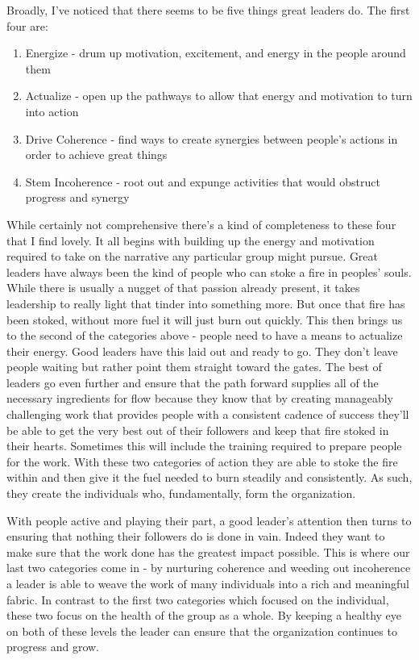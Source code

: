 \documentclass[10pt,a5paper]{book}
\begin{document}
Broadly, I've noticed that there seems to be five things great leaders do. The first four are:
\begin{enumerate}
\item Energize - drum up motivation, excitement, and energy in the people around them
\item Actualize - open up the pathways to allow that energy and motivation to turn into action
\item Drive Coherence - find ways to create synergies between people's actions in order to achieve great things
\item Stem Incoherence - root out and expunge activities that would obstruct progress and synergy
\end{enumerate}

While certainly not comprehensive there's a kind of completeness to these four that I find lovely. It all begins with building up the energy and motivation required to take on the narrative any particular group might pursue. Great leaders have always been the kind of people who can stoke a fire in peoples' souls. While there is usually a nugget of that passion already present, it takes leadership to really light that tinder into something more. But once that fire has been stoked, without more fuel it will just burn out quickly. This then brings us to the second of the categories above - people need to have a means to actualize their energy. Good leaders have this laid out and ready to go. They don't leave people waiting but rather point them straight toward the gates. The best of leaders go even further and ensure that the path forward supplies all of the necessary ingredients for flow because they know that by creating manageably challenging work that provides people with a consistent cadence of success they'll be able to get the very best out of their followers and keep that fire stoked in their hearts. Sometimes this will include the training required to prepare people for the work. With these two categories of action they are able to stoke the fire within and then give it the fuel needed to burn steadily and consistently. As such, they create the individuals who, fundamentally, form the organization. 

With people active and playing their part, a good leader's attention then turns to ensuring that nothing their followers do is done in vain. Indeed they want to make sure that the work done has the greatest impact possible. This is where our last two categories come in - by nurturing coherence and weeding out incoherence a leader is able to weave the work of many individuals into a rich and meaningful fabric. In contrast to the first two categories which focused on the individual, these two focus on the health of the group as a whole. By keeping a healthy eye on both of these levels the leader can ensure that the organization continues to progress and grow. 
\end{document}

